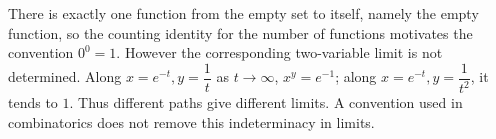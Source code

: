 There is exactly one function from the empty set to itself, namely the empty function, so the counting identity for the number of functions motivates the convention $0^0=1$. However the corresponding two-variable limit is not determined. Along $x=e^{-t},y=\dfrac{1}{t}$ as $t\to\infty$, $x^y=e^{-1}$; along $x=e^{-t},y=\dfrac{1}{t^2}$, it tends to $1$. Thus different paths give different limits. A convention used in combinatorics does not remove this indeterminacy in limits.
